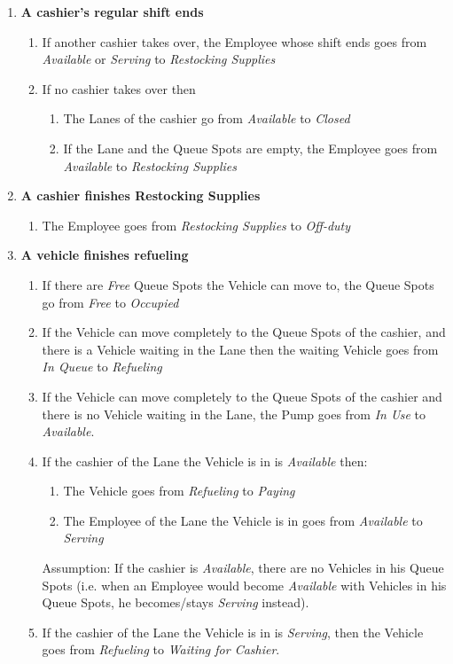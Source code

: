 \begin{enumerate}
	\item \textbf{A cashier's regular shift ends}
	\begin{enumerate}
		\item If another cashier takes over, the Employee whose shift ends goes from \textit{Available} or \textit{Serving} to \textit{Restocking Supplies}
		\item If no cashier takes over then
		\begin{enumerate}
			\item The Lanes of the cashier go from \textit{Available} to \textit{Closed}
			\item If the Lane and the Queue Spots are empty, the Employee goes from \textit{Available} to \textit{Restocking Supplies}
		\end{enumerate}
	\end{enumerate}
	
	\item \textbf{A cashier finishes Restocking Supplies}
	\begin{enumerate}
		\item{The Employee goes from \textit{Restocking Supplies} to \textit{Off-duty}}
	\end{enumerate}
	
	\item \textbf{A vehicle finishes refueling}
	\begin{enumerate}
		\item If there are \textit{Free} Queue Spots the Vehicle can move to, the Queue Spots go from \textit{Free} to \textit{Occupied}
		\item If the Vehicle can move completely to the Queue Spots of the cashier, and there is a Vehicle waiting in the Lane then the waiting Vehicle goes from \textit{In Queue} to \textit{Refueling}
		\item If the Vehicle can move completely to the Queue Spots of the cashier and there is no Vehicle waiting in the Lane, the Pump goes from \textit{In Use} to \textit{Available}.
		\item If the cashier of the Lane the Vehicle is in is \textit{Available} then:
		\begin{enumerate}
			\item The Vehicle goes from \textit{Refueling} to \textit{Paying}
			\item The Employee of the Lane the Vehicle is in goes from \textit{Available} to \textit{Serving}
		\end{enumerate}
		Assumption: If the cashier is \textit{Available}, there are no Vehicles in his Queue Spots (i.e. when an Employee would become \textit{Available} with Vehicles in his Queue Spots, he becomes/stays \textit{Serving} instead).
		\item If the cashier of the Lane the Vehicle is in is \textit{Serving}, then the Vehicle goes from \textit{Refueling} to \textit{Waiting for Cashier}.
	\end{enumerate}
	

\end{enumerate}
